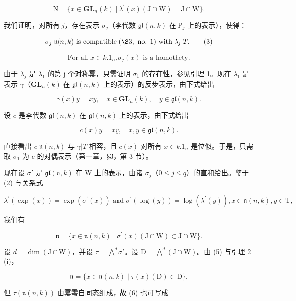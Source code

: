 \[
\mathrm{N} = \{x \in \mathbf {G L} _ {n} (k) \mid \lambda^ {\prime} (x) (\mathrm{J} \cap \mathrm{W}) = \mathrm{J} \cap \mathrm{W} \}.\tag{2}
\]

我们证明，对所有 \(j\)，存在表示 \(\sigma_{j}\)（李代数 \(\mathfrak{gl}(n,k)\) 在 \(\mathrm{P}_j\) 上的表示），使得：

\[
\sigma_ {j} | \mathfrak {n} (n, k) \text {   is   compatible   } (\S 3, \text {   no.   } 1) \text {   with   } \lambda_ {j} | T.\tag{3}
\]

\[
\text { For   all } x \in k. 1 _ {n}, \sigma_ {j} (x) \text { is   a   homothety. }\tag{4}
\]

由于 \(\lambda_{j}\) 是 \(\lambda_{1}\) 的第 j 个对称幂，只需证明 \(\sigma_{1}\) 的存在性，参见引理 1。现在 \(\lambda_{1}\) 是表示 \(\gamma\)（\(\mathbf{GL}_{n}(k)\) 在 \(\mathfrak{gl}(n,k)\) 上的表示）的反步表示，由下式给出

\[
\gamma (x) y = x y, \quad x \in \mathbf {G L} _ {n} (k), \quad y \in \mathfrak {g l} (n, k).
\]

设 \(c\) 是李代数 \(\mathfrak{gl}(n,k)\) 在 \(\mathfrak{gl}(n,k)\) 上的表示，由下式给出

\[
c (x) y = x y, \quad x, y \in \mathfrak {g l} (n, k).
\]

直接看出 \(c|\mathfrak{n}(n,k)\) 与 \(\gamma|T\) 相容，且 \(c(x)\) 对所有 \(x \in k.1_{n}\) 是位似。于是，只需取 \(\sigma_{1}\) 为 c 的对偶表示（第一章，§3，第 3 节）。

现在设 \(\sigma'\) 是 \(\mathfrak{gl}(n,k)\) 在 W 上的表示，由诸 \(\sigma_j\)（\(0 \leq j \leq q\)）的直和给出。鉴于 (2) 与关系式

\[
\lambda^ {\prime} (\exp (x)) = \exp (\sigma^ {\prime} (x)) \text { and } \sigma^ {\prime} (\log (y)) = \log (\lambda^ {\prime} (y)), x \in \mathfrak {n} (n, k), y \in \mathrm{T},
\]

我们有

\[
\mathfrak {n} = \{x \in \mathfrak {n} (n, k) \mid \sigma^ {\prime} (x) (\mathrm{J} \cap \mathrm{W}) \subset \mathrm{J} \cap \mathrm{W} \}.\tag{5}
\]

设 \(d = \dim(\mathrm{J} \cap \mathrm{W})\)，并设 \(\tau = \bigwedge^{d} \sigma'\)。设 \(\mathrm{D} = \bigwedge^{d} (\mathrm{J} \cap \mathrm{W})\)。由 (5) 与引理 2 (i)，

\[
\mathfrak {n} = \{x \in \mathfrak {n} (n, k) \mid \tau (x) (\mathrm{D}) \subset \mathrm{D} \}.\tag{6}
\]

但 \(\tau (\mathfrak{n}(n,k))\) 由幂零自同态组成，故 (6) 也可写成

